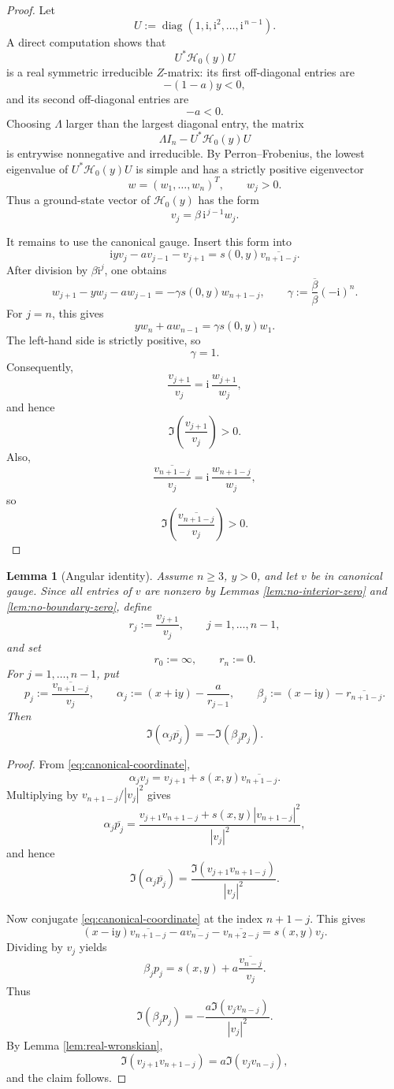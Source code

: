 \documentclass[11pt]{amsart}
\numberwithin{equation}{section}
\DeclareMathOperator{\diag}{diag}
\newcommand{\ii}{\mathrm i}
\newtheorem{lemma}[theorem]{Lemma}
\begin{document}
\begin{proof}
Let
\[
U:=\diag(1,\ii,\ii^2,\dots,\ii^{\,n-1}).
\]
A direct computation shows that
\[
U^*\mathcal H_0(y)U
\]
is a real symmetric irreducible \(Z\)-matrix: its first off-diagonal entries are
\[
-(1-a)y<0,
\]
and its second off-diagonal entries are
\[
-a<0.
\]
Choosing \(\Lambda\) larger than the largest diagonal entry, the matrix
\[
\Lambda I_n-U^*\mathcal H_0(y)U
\]
is entrywise nonnegative and irreducible.  By Perron--Frobenius, the lowest eigenvalue of \(U^*\mathcal H_0(y)U\) is simple and has a strictly positive eigenvector
\[
w=(w_1,\dots,w_n)^T,
\qquad
w_j>0.
\]
Thus a ground-state vector of \(\mathcal H_0(y)\) has the form
\[
v_j=\beta\,\ii^{\,j-1}w_j.
\]

It remains to use the canonical gauge.  Insert this form into
\[
\ii yv_j-av_{j-1}-v_{j+1}
=
s(0,y)\overline{v_{n+1-j}}.
\]
After division by \(\beta\ii^j\), one obtains
\[
w_{j+1}-yw_j-aw_{j-1}
=
-\gamma s(0,y)w_{n+1-j},
\qquad
\gamma:=\frac{\overline\beta}{\beta}(-\ii)^n.
\]
For \(j=n\), this gives
\[
yw_n+aw_{n-1}
=
\gamma s(0,y)w_1.
\]
The left-hand side is strictly positive, so
\[
\gamma=1.
\]
Consequently,
\[
\frac{v_{j+1}}{v_j}
=
\ii\,\frac{w_{j+1}}{w_j},
\]
and hence
\[
\Im\left(\frac{v_{j+1}}{v_j}\right)>0.
\]
Also,
\[
\frac{\overline{v_{n+1-j}}}{v_j}
=
\ii\,\frac{w_{n+1-j}}{w_j},
\]
so
\[
\Im\left(\frac{\overline{v_{n+1-j}}}{v_j}\right)>0.
\]
\end{proof}

\begin{lemma}[Angular identity]\label{lem:angular-identity}
Assume \(n\ge3\), \(y>0\), and let \(v\) be in canonical gauge.  Since all entries of \(v\) are nonzero by Lemmas \ref{lem:no-interior-zero} and \ref{lem:no-boundary-zero}, define
\[
r_j:=\frac{v_{j+1}}{v_j},
\qquad
j=1,\dots,n-1,
\]
and set
\[
r_0:=\infty,
\qquad
r_n:=0.
\]
For \(j=1,\dots,n-1\), put
\[
p_j:=\frac{\overline{v_{n+1-j}}}{v_j},
\qquad
\alpha_j:=(x+\ii y)-\frac{a}{r_{j-1}},
\qquad
\beta_j:=(x-\ii y)-\overline{r_{n+1-j}}.
\]
Then
\[
\Im(\alpha_j\overline{p_j})
=
-\Im(\beta_jp_j).
\]
\end{lemma}

\begin{proof}
From \eqref{eq:canonical-coordinate},
\[
\alpha_jv_j
=
v_{j+1}+s(x,y)\overline{v_{n+1-j}}.
\]
Multiplying by \(v_{n+1-j}/|v_j|^2\) gives
\[
\alpha_j\overline{p_j}
=
\frac{v_{j+1}v_{n+1-j}+s(x,y)|v_{n+1-j}|^2}{|v_j|^2},
\]
and hence
\[
\Im(\alpha_j\overline{p_j})
=
\frac{\Im(v_{j+1}v_{n+1-j})}{|v_j|^2}.
\]

Now conjugate \eqref{eq:canonical-coordinate} at the index \(n+1-j\).  This gives
\[
(x-\ii y)\overline{v_{n+1-j}}
-a\overline{v_{n-j}}
-\overline{v_{n+2-j}}
=
s(x,y)v_j.
\]
Dividing by \(v_j\) yields
\[
\beta_jp_j
=
s(x,y)+a\frac{\overline{v_{n-j}}}{v_j}.
\]
Thus
\[
\Im(\beta_jp_j)
=
-\frac{a\Im(v_jv_{n-j})}{|v_j|^2}.
\]
By Lemma \ref{lem:real-wronskian},
\[
\Im(v_{j+1}v_{n+1-j})
=
a\Im(v_jv_{n-j}),
\]
and the claim follows.
\end{proof}
\end{document}
